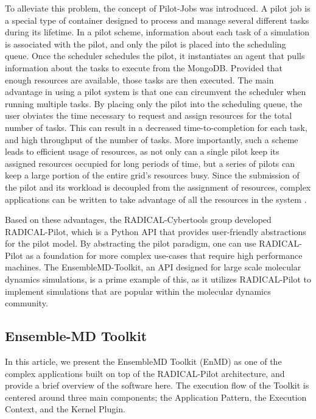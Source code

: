 \documentclass[]{article}
\begin{document}
	To alleviate this problem, the concept of Pilot-Jobs was introduced. A pilot job is a special type of container designed to process and manage several different tasks during its lifetime. In a pilot scheme, information about each task of a simulation is associated with the pilot, and only the pilot is placed into the scheduling queue. Once the scheduler schedules the pilot, it instantiates an agent that pulls information about the tasks to execute from the MongoDB. Provided that enough resources are available, those tasks are then executed. The main advantage in using a pilot system is that one can circumvent the scheduler when running multiple tasks. By placing only the pilot into the scheduling queue, the user obviates the time necessary to request and assign resources for the total number of tasks. This can result in a decreased time-to-completion for each task, and high throughput of the number of tasks. More importantly, such a scheme leads to efficient usage of resources, as not only can a single pilot keep its assigned resources occupied for long periods of time, but a series of pilots can keep a large portion of the entire grid's resources busy. Since the submission of the pilot and its workload is decoupled from the assignment of resources, complex applications can be written to take advantage of all the resources in the system \cite{rp_paper}.

	Based on these advantages, the RADICAL-Cybertools group developed RADICAL-Pilot, which is a Python API that provides user-friendly abstractions for the pilot model. By abstracting the pilot paradigm, one can use RADICAL-Pilot as a foundation for more complex use-cases that require high performance machines. The EnsembleMD-Toolkit, an API designed for large scale molecular dynamics simulations, is a prime example of this, as it utilizes RADICAL-Pilot to implement simulations that are popular within the molecular dynamics community.

		\subsection{Ensemble-MD Toolkit} 
			In this article, we present the EnsembleMD Toolkit (EnMD) as one of the complex applications built on top of the RADICAL-Pilot architecture, and provide a brief overview of the software here. The execution flow of the Toolkit is centered around three main components; the Application Pattern, the Execution Context, and the Kernel Plugin. 

\end{document}
